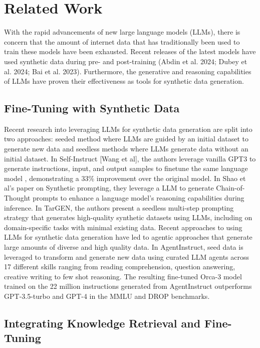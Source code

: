 \section{Related Work}

With the rapid advancements of new large language models (LLMs), there is
concern that the amount of internet data that has traditionally been used to
train these models have been exhausted. Recent releases of the latest models
have used synthetic data during pre- and post-training (Abdin et al. 2024; Dubey
et al. 2024; Bai et al. 2023). Furthermore, the generative and reasoning
capabilities of LLMs have proven their effectiveness as tools for synthetic data
generation.

\subsection{Fine-Tuning with Synthetic Data}

Recent research into leveraging LLMs for synthetic data generation are split
into two approaches: seeded method where LLMs are guided by an initial dataset
to generate new data and seedless methods where LLMs generate data without an
initial dataset. In Self-Instruct [Wang et al], the authors leverage vanilla
GPT3 to generate instructions, input, and output samples to finetune the same
language model , demonstrating a 33\% improvement over the original model. In
Shao et al’s paper on Synthetic prompting, they leverage a LLM to generate
Chain-of-Thought prompts to enhance a language model’s reasoning capabilities
during inference. In TarGEN, the authors present a seedless multi-step prompting
strategy that generates high-quality synthetic datasets using LLMs, including on
domain-specific tasks with minimal existing data. Recent approaches to using
LLMs for synthetic data generation have led to agentic approaches that generate
large amounts of diverse and high quality data. In AgentInstruct, seed data is
leveraged to transform and generate new data using curated LLM agents across 17
different skills ranging from reading comprehension, question answering,
creative writing to few shot reasoning. The resulting fine-tuned Orca-3 model
trained on the 22 million instructions generated from AgentInstruct outperforms
GPT-3.5-turbo and GPT-4 in the MMLU and DROP benchmarks.

\subsection{Integrating Knowledge Retrieval and Fine-Tuning}

